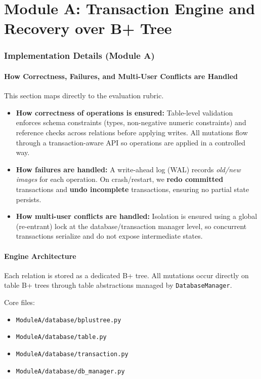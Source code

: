 \documentclass[12pt,a4paper]{article}
\begin{document}
\part*{Module A: Transaction Engine and Recovery over B+ Tree}

\section{Implementation Details (Module A)}

\subsection{How Correctness, Failures, and Multi-User Conflicts are Handled}
This section maps directly to the evaluation rubric.

\begin{itemize}[noitemsep]
  \item \textbf{How correctness of operations is ensured:} Table-level validation enforces schema constraints (types, non-negative numeric constraints) and reference checks across relations before applying writes. All mutations flow through a transaction-aware API so operations are applied in a controlled way.
  \item \textbf{How failures are handled:} A write-ahead log (WAL) records \emph{old/new images} for each operation. On crash/restart, we \textbf{redo committed} transactions and \textbf{undo incomplete} transactions, ensuring no partial state persists.
  \item \textbf{How multi-user conflicts are handled:} Isolation is ensured using a global (re-entrant) lock at the database/transaction manager level, so concurrent transactions serialize and do not expose intermediate states.
\end{itemize}

\subsection{Engine Architecture}
Each relation is stored as a dedicated B+ tree. All mutations occur directly on table B+ trees through table abstractions managed by \texttt{DatabaseManager}.

Core files:
\begin{itemize}[noitemsep]
  \item \texttt{ModuleA/database/bplustree.py}
  \item \texttt{ModuleA/database/table.py}
  \item \texttt{ModuleA/database/transaction.py}
  \item \texttt{ModuleA/database/db\_manager.py}
\end{itemize}
\end{document}

